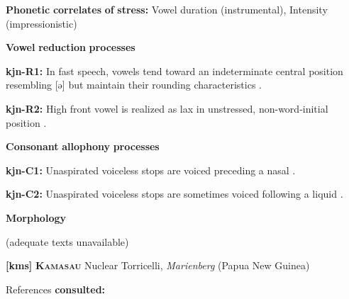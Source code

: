 \documentclass[output=paper]{langsci/langscibook}
\begin{document}
\begin{styleBody}
\textbf{Phonetic} \textbf{correlates} \textbf{of} \textbf{stress:} Vowel duration (instrumental), Intensity (impressionistic)
\end{styleBody}

\begin{styleBody}
\textbf{Vowel} \textbf{reduction} \textbf{processes}
\end{styleBody}

\begin{styleBody}
\textbf{kjn-R1:} In fast speech, vowels tend toward an indeterminate central position resembling [ə] but maintain their rounding characteristics \citep[41]{Sommer1969}.
\end{styleBody}

\begin{styleBody}
\textbf{kjn-R2:} High front vowel is realized as lax in unstressed, non-word-initial position \citep[41]{Sommer1969}.
\end{styleBody}

\begin{styleBody}
\textbf{Consonant} \textbf{allophony} \textbf{processes}
\end{styleBody}

\begin{styleBody}
\textbf{kjn-C1:} Unaspirated voiceless stops are voiced preceding a nasal \citep[39]{Sommer1969}.
\end{styleBody}

\begin{styleBody}
\textbf{kjn-C2:} Unaspirated voiceless stops are sometimes voiced following a liquid \citep[39]{Sommer1969}.
\end{styleBody}

\begin{styleBody}
\textbf{Morphology}
\end{styleBody}

\begin{styleBody}
(adequate texts unavailable)
\end{styleBody}

\begin{styleBody}
\textbf{[kms]}   \textbf{\textsc{Kamasau}}  Nuclear Torricelli, \textit{Marienberg} (Papua New Guinea)
\end{styleBody}

\begin{styleBody}
References \textbf{consulted:} \citet{SandersSanders1980}
\end{styleBody}
\end{document}
